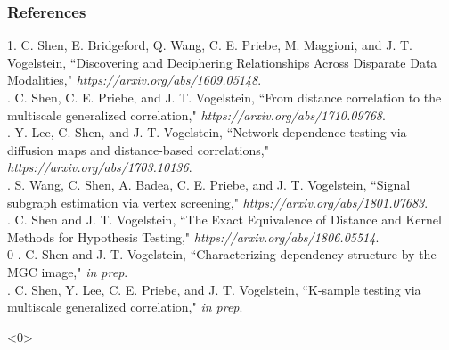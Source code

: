 \documentclass[mathserif,t]{beamer}
\newcommand{\blind}{0}
\begin{document}
%
%

\begin{frame}%
\frametitle{References}
\small

1. \textcolor{UniOrange}{C. Shen}, E. Bridgeford, Q. Wang, C. E. Priebe, M. Maggioni, and J. T. Vogelstein,
``Discovering and Deciphering Relationships Across Disparate Data Modalities," \textit{https://arxiv.org/abs/1609.05148}.\\
. \textcolor{UniOrange}{C. Shen}, C. E. Priebe, and J. T. Vogelstein, ``From distance correlation to the
multiscale generalized correlation," \textit{https://arxiv.org/abs/1710.09768}.\\
. Y. Lee, \textcolor{UniOrange}{C. Shen}, and J. T. Vogelstein, ``Network dependence testing via diffusion
maps and distance-based correlations," \textit{https://arxiv.org/abs/1703.10136}.\\
. S. Wang, \textcolor{UniOrange}{C. Shen}, A. Badea, C. E. Priebe, and J. T. Vogelstein, ``Signal
subgraph estimation via vertex screening," \textit{https://arxiv.org/abs/1801.07683}.\\
. \textcolor{UniOrange}{C. Shen} and J. T. Vogelstein, ``The Exact Equivalence of Distance and Kernel Methods for Hypothesis Testing," \textit{https://arxiv.org/abs/1806.05514}.\\
\blind
{
. \textcolor{UniOrange}{C. Shen} and J. T. Vogelstein, ``Characterizing dependency structure by the MGC image," \textit{in prep}.\\
. \textcolor{UniOrange}{C. Shen}, Y. Lee, C. E. Priebe, and J. T. Vogelstein, ``K-sample testing via
multiscale generalized correlation," \textit{in prep}.
}\fi
%
%
\end{frame}

\addtocounter{framenumber}{-1} 
\begin{frame}<0> 

\end{frame} 
%

\end{document}
